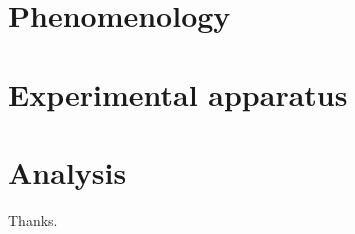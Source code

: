 \documentclass[a4paper,11pt,twoside]{StyleThese}
\begin{document}


\dominitoc


\cleardoublepage

\tableofcontents

\mainmatter

%

\part{Phenomenology}


\part{Experimental apparatus}


\part{Analysis}




% 

\appendix


% 

%





Thanks.

\cleardoublepage

\newpage
\thispagestyle{empty}
\strut
\newpage
\end{document}
